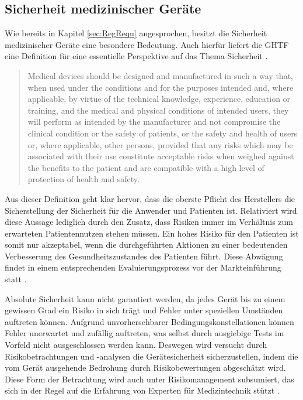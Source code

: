 \documentclass[a4paper,12pt]{report}
\begin{document}
\subsection{Sicherheit medizinischer Geräte}\label{subsec:Safety}
Wie bereits in Kapitel \ref{sec:RegRequ} angesprochen, besitzt die Sicherheit medizinischer Geräte eine besondere Bedeutung. Auch hierfür liefert die \ac{GHTF} eine Definition für eine essentielle Perspektive auf das Thema Sicherheit \citep[][S. 6]{GHTF2012b}.
\begin{quote}
Medical devices should be designed and manufactured in such a way that, when used under the conditions and for the purposes intended and, where applicable, by virtue of the technical knowledge, experience, education or training, and the medical and physical conditions of intended users, they will perform as intended by the manufacturer and not compromise the clinical condition or the safety of patients, or the safety and health of users or, where applicable, other persons, provided that any risks which may be associated with their use constitute acceptable risks when weighed against the benefits to the patient and are compatible with a high level of protection of health and safety.
\end{quote}
Aus dieser Definition geht klar hervor, dass die oberste Pflicht des Herstellers die Sicherstellung der Sicherheit für die Anwender und Patienten ist. Relativiert wird diese Aussage lediglich durch den Zusatz, dass Risiken immer im Verhältnis zum erwarteten Patientennutzen stehen müssen. Ein hohes Risiko für den Patienten ist somit nur akzeptabel, wenn die durchgeführten Aktionen zu einer bedeutenden Verbesserung des Gesundheitszustandes des Patienten führt. Diese Abwägung findet in einem entsprechenden Evaluierungsprozess vor der Markteinführung statt \citep[vgl.][S. 11]{Ramakrishna2015}. 

Absolute Sicherheit kann nicht garantiert werden, da jedes Gerät bis zu einem gewissen Grad ein Risiko in sich trägt und Fehler unter speziellen Umständen auftreten können. Aufgrund unvorhersehbarer Bedingungskonstellationen können Fehler unerwartet und zufällig auftreten, was selbst durch ausgiebige Tests im Vorfeld nicht ausgeschlossen werden kann. Deswegen wird versucht durch Risikobetrachtungen und -analysen die Gerätesicherheit sicherzustellen, indem die vom Gerät ausgehende Bedrohung durch Risikobewertungen abgeschätzt wird. Diese Form der Betrachtung wird auch unter Risikomanagement subsumiert, das sich in der Regel auf die Erfahrung von Experten für Medizintechnik stützt \citep[vgl.][S. 3]{Cheng2003}.
\end{document}
